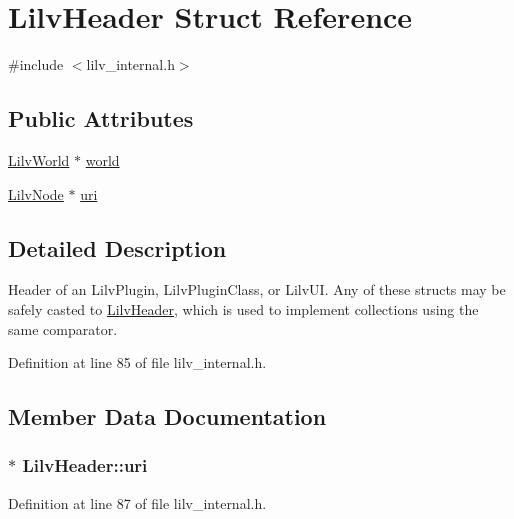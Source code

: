 \hypertarget{struct_lilv_header}{}\section{Lilv\+Header Struct Reference}
\label{struct_lilv_header}


{\ttfamily \#include $<$lilv\+\_\+internal.\+h$>$}

\subsection*{Public Attributes}
\begin{DoxyCompactItemize}
\item 
\hyperlink{lilv_8h_a91c1745aa6ffca2b6b87c56df6c5ab86}{Lilv\+World} $\ast$ \hyperlink{struct_lilv_header_accd62b6164586c0c3c128d3394ef3160}{world}
\item 
\hyperlink{lilv_8h_ae183dca3dca5368d34dbd863a405437b}{Lilv\+Node} $\ast$ \hyperlink{struct_lilv_header_adc86de51f1f6d22ee4c28b88ae7b1b85}{uri}
\end{DoxyCompactItemize}


\subsection{Detailed Description}
Header of an Lilv\+Plugin, Lilv\+Plugin\+Class, or Lilv\+UI. Any of these structs may be safely casted to \hyperlink{struct_lilv_header}{Lilv\+Header}, which is used to implement collections using the same comparator. 

Definition at line 85 of file lilv\+\_\+internal.\+h.



\subsection{Member Data Documentation}
\subsubsection[{\texorpdfstring{uri}{uri}}]{$\ast$ Lilv\+Header\+::uri}\hypertarget{struct_lilv_header_adc86de51f1f6d22ee4c28b88ae7b1b85}{}\label{struct_lilv_header_adc86de51f1f6d22ee4c28b88ae7b1b85}


Definition at line 87 of file lilv\+\_\+internal.\+h.

